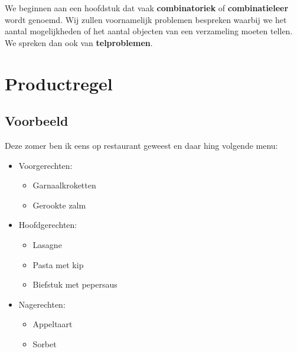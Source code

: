\documentclass[12pt,a4paper,twoside]{article}
\begin{document}
\pagebreak
\begin{singlespacing}
  \footnotesize
  \tableofcontents
\end{singlespacing}
\thispagestyle{empty}

\pagebreak
{}

\pagestyle{fancy}
\fancyhead[RE,LO]{}

We beginnen aan een hoofdstuk dat vaak {\bf combinatoriek} of {\bf combinatieleer} wordt genoemd. Wij zullen voornamelijk problemen bespreken waarbij we het aantal mogelijkheden of het aantal objecten van een verzameling moeten tellen. We spreken dan ook van {\bf telproblemen}.

\section{Productregel}

\subsection{Voorbeeld}

Deze zomer ben ik eens op restaurant geweest en daar hing volgende menu:

\begin{center}
  \begin{minipage}{0.6\linewidth}
    \begin{mdframed}
      \begin{itemize}
      \item Voorgerechten:
        \begin{itemize}
        \item Garnaalkroketten
        \item Gerookte zalm
        \end{itemize}
      \item Hoofdgerechten:
        \begin{itemize}
        \item Lasagne
        \item Pasta met kip
        \item Biefstuk met pepersaus
        \end{itemize}
      \item Nagerechten:
        \begin{itemize}
        \item Appeltaart
        \item Sorbet
        \end{itemize}
      \end{itemize}
    \end{mdframed}
  \end{minipage}
\end{center}
\end{document}
